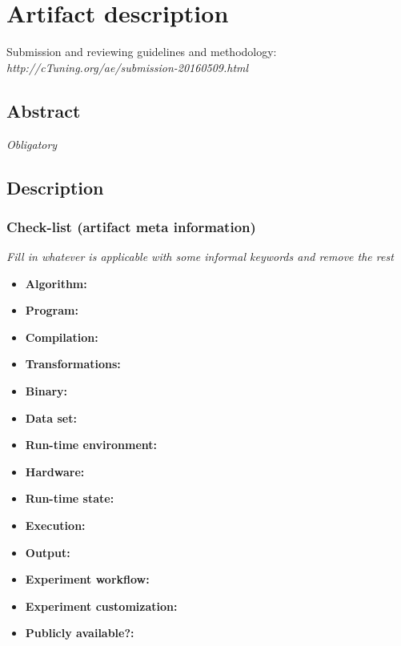 \documentclass{sigplanconf}
\begin{document}


\appendix
\section{Artifact description}

Submission and reviewing guidelines and methodology: \\
{\em http://cTuning.org/ae/submission-20160509.html}

\subsection{Abstract}

{\em Obligatory}

\subsection{Description}

\subsubsection{Check-list (artifact meta information)}

{\em Fill in whatever is applicable with some informal keywords and remove the rest}

{\small
\begin{itemize}
  \item {\bf Algorithm: }
  \item {\bf Program: }
  \item {\bf Compilation: }
  \item {\bf Transformations: }
  \item {\bf Binary: }
  \item {\bf Data set: }
  \item {\bf Run-time environment: }
  \item {\bf Hardware: }
  \item {\bf Run-time state: }
  \item {\bf Execution: }
  \item {\bf Output: }
  \item {\bf Experiment workflow: }
  \item {\bf Experiment customization: }
  \item {\bf Publicly available?: }
\end{itemize}
}
\end{document}
